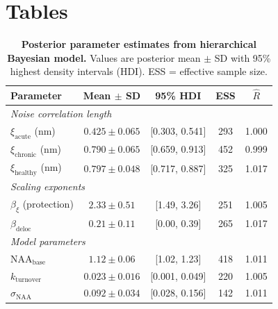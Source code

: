 \documentclass[10pt,a4paper]{article}
\begin{document}
\section*{Tables}

\begin{table}[htbp]
\centering
\caption{\textbf{Posterior parameter estimates from hierarchical Bayesian model.} Values are posterior mean $\pm$ SD with 95\% highest density intervals (HDI). ESS = effective sample size.}
\label{tab:posteriors}
\begin{tabular}{lcccc}
\toprule
\textbf{Parameter} & \textbf{Mean $\pm$ SD} & \textbf{95\% HDI} & \textbf{ESS} & \textbf{$\hat{R}$} \\
\midrule
\multicolumn{5}{l}{\textit{Noise correlation length}} \\
$\xi_{\text{acute}}$ (nm) & $0.425 \pm 0.065$ & [0.303, 0.541] & 293 & 1.000 \\
$\xi_{\text{chronic}}$ (nm) & $0.790 \pm 0.065$ & [0.659, 0.913] & 452 & 0.999 \\
$\xi_{\text{healthy}}$ (nm) & $0.797 \pm 0.048$ & [0.717, 0.887] & 325 & 1.017 \\
\midrule
\multicolumn{5}{l}{\textit{Scaling exponents}} \\
$\beta_\xi$ (protection) & $2.33 \pm 0.51$ & [1.49, 3.26] & 251 & 1.005 \\
$\beta_{\text{deloc}}$ & $0.21 \pm 0.11$ & [0.00, 0.39] & 265 & 1.017 \\
\midrule
\multicolumn{5}{l}{\textit{Model parameters}} \\
NAA$_{\text{base}}$ & $1.12 \pm 0.06$ & [1.02, 1.23] & 418 & 1.011 \\
$k_{\text{turnover}}$ & $0.023 \pm 0.016$ & [0.001, 0.049] & 220 & 1.005 \\
$\sigma_{\text{NAA}}$ & $0.092 \pm 0.034$ & [0.028, 0.156] & 142 & 1.011 \\
\bottomrule
\end{tabular}
\end{table}
\end{document}
